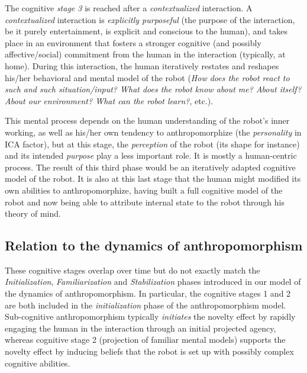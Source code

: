 \documentclass{frontiersSCNS} %
\begin{document}
The cognitive \emph{stage 3} is reached after a \emph{contextualized} interaction.
A \emph{contextualized} interaction is \emph{explicitly purposeful} (the purpose
of the interaction, be it purely entertainment, is explicit and conscious to the
human), and takes place in an environment that fosters a stronger cognitive (and
possibly affective/social) commitment from the human in the interaction
(typically, at home). During this interaction, the human iteratively restates
and reshapes his/her behavioral and mental model of the robot (\emph{How does
the robot react to such and such situation/input?  What does the robot know
about me? About itself? About our environment? What can the robot learn?}, etc.).

This mental process depends on the human understanding of the robot's
inner working, as well as his/her own tendency to anthropomorphize (the
\emph{personality} in ICA factor), but at this
stage, the \emph{perception} of the robot (its shape for instance) and its
intended \emph{purpose} play a less important role. It is mostly a human-centric
process.  The result of this third phase would be an iteratively adapted
cognitive model of the robot. It is also at this last stage that the human might
modified its own abilities to anthropomorphize, having built a full cognitive
model of the robot and now being able to attribute internal state to the robot
through his theory of mind.


\subsection{Relation to the dynamics of anthropomorphism}

These cognitive stages overlap over time but do not exactly match the
\emph{Initialization}, \emph{Familiarization} and \emph{Stabilization} phases
introduced in our model of the dynamics of anthropomorphism. In particular,
the cognitive stages 1 and 2 are both included in the \emph{initialization} phase
of the anthropomorphism model. Sub-cognitive anthropomorphism typically
\emph{initiates} the novelty effect by rapidly engaging the human in the
interaction through an initial projected agency, whereas cognitive stage 2
(projection of familiar mental models) supports the novelty effect by inducing
beliefs that the robot is set up with possibly complex cognitive abilities.
\end{document}
